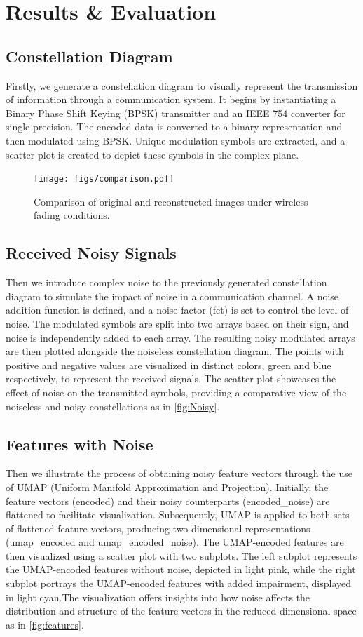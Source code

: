 \documentclass[10pt,twocolumn]{IEEEtran}
\begin{document}
\section{Results \& Evaluation}
\subsection{Constellation Diagram}
Firstly, we generate a constellation diagram to visually represent the transmission of information through a communication system. It begins by instantiating a Binary Phase Shift Keying (BPSK) transmitter and an IEEE 754 converter for single precision. The encoded data is converted to a binary representation and then modulated using BPSK. Unique modulation symbols are extracted, and a scatter plot is created to depict these symbols in the complex plane.

\begin{figure}[t!]
    \centering
    \texttt{[image: figs/comparison.pdf]}
    \caption{Comparison of original and reconstructed images under wireless fading conditions.}
    \label{fig:reconstructed}
\end{figure}

\subsection{Received Noisy Signals}
Then we introduce complex noise to the previously generated constellation diagram to simulate the impact of noise in a communication channel. A noise addition function is defined, and a noise factor (fct) is set to control the level of noise. The modulated symbols are split into two arrays based on their sign, and noise is independently added to each array. The resulting noisy modulated arrays are then plotted alongside the noiseless constellation diagram. The points with positive and negative values are visualized in distinct colors, green and blue respectively, to represent the received signals. The scatter plot showcases the effect of noise on the transmitted symbols, providing a comparative view of the noiseless and noisy constellations as in \ref{fig:Noisy}.

\subsection{Features with Noise}
Then we illustrate the process of obtaining noisy feature vectors through the use of UMAP (Uniform Manifold Approximation and Projection). Initially, the feature vectors (encoded) and their noisy counterparts (encoded\_noise) are flattened to facilitate visualization. Subsequently, UMAP is applied to both sets of flattened feature vectors, producing two-dimensional representations (umap\_encoded and umap\_encoded\_noise). The UMAP-encoded features are then visualized using a scatter plot with two subplots. The left subplot represents the UMAP-encoded features without noise, depicted in light pink, while the right subplot portrays the UMAP-encoded features with added impairment, displayed in light cyan.The visualization offers insights into how noise affects the distribution and structure of the feature vectors in the reduced-dimensional space as in \ref{fig:features}.
\end{document}

